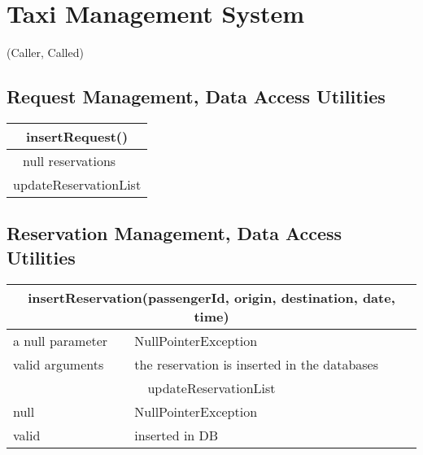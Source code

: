 \documentclass[11pt,oneside,a4paper]{report}
\begin{document}
\chapter{Taxi Management System}
{\Huge (Caller, Called)}
\section{Request Management, Data Access Utilities}
\begin{table}[ph]
\centering
\begin{tabular}{c|c}
\hline
\multicolumn{2}{c}{insertRequest()}\\\hline\hline
null
reservations & \\\hline
\multicolumn{2}{c}{updateReservationList}\\\hline
\end{tabular}
\end{table}


\section{Reservation Management, Data Access Utilities}
\begin{table}[ph]
\centering
\begin{tabular}{p{5cm}|p{6cm}}
	\hline
	\multicolumn{2}{c}{insertReservation(passengerId, origin, destination, date, time)}\\\hline\hline
	a null parameter &
	NullPointerException \\\hline
	valid arguments &
	the reservation is inserted in the databases \\\hline\hline
	
	\multicolumn{2}{c}{updateReservationList}\\\hline\hline
	null &
	NullPointerException \\\hline
	valid &
	inserted in DB \\\hline
\end{tabular}
\end{table}
\end{document}
